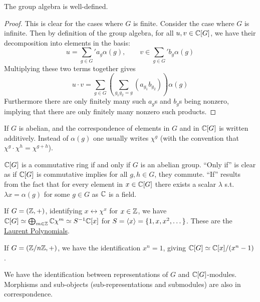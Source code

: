 \documentclass{article}
\begin{document}
\begin{proposition}
    The group algebra is well-defined.
\end{proposition}

\begin{proof}
    This is clear for the cases where $G$ is finite. Consider the case where $G$ is infinite. Then by definition of the group algebra, for all $u, v \in \mathbb{C}[G]$, we have their decomposition into elements in the basis:
    \[
        u = \sum_{g \in G}' a_g \alpha(g), \qquad v \in \sum_{g \in G}' b_g \alpha(g)
    \]
    Multiplying these two terms together gives
    \[
        u \cdot v = \sum_{g \in G} \left( \sum_{g_1 g_2 = g}  (a_{g_1} b_{g_2}) \right) \alpha(g)
    \]
    Furthermore there are only finitely many such $a_g$s and $b_g$s being nonzero, implying that there are only finitely many nonzero such products. 
\end{proof}

\begin{notation}
    If $G$ is abelian, and the correspondence of elements in $G$ and in $\mathbb{C}[G]$ is written additively. Instead of $\alpha(g)$ one usually writes $\chi^g$ (with the convention that $\chi^g \cdot \chi^h = \chi^{g + h}$).
\end{notation}

\begin{remark}
    $\mathbb{C}[G]$ is a commutative ring if and only if $G$ is an abelian group. ``Only if'' is clear as if $\mathbb{C}[G]$ is commutative implies for all $g, h \in G$, they commute. ``If'' results from the fact that for every element in $x \in \mathbb{C}[G]$ there exists a scalar $\lambda$ s.t. $\lambda x = \alpha(g)$ for some $g \in G$ as $\mathbb{C}$ is a field.
\end{remark}

\begin{example}
    If $G = (\mathbb{Z}, +)$, identifying $x \leftrightarrow \chi^x$ for $x \in \mathbb{Z}$, we have $\mathbb{C}[G] \simeq \bigoplus_{m\in \mathbb{Z}} \mathbb{C}\chi^m \simeq S^{-1}\mathbb{C}[x]$ for $S = \left\langle x \right\rangle = \{1, x, x^2, \dots\}$. These are the \underline{Laurent Polynomials}. 
    
    If $G = (\mathbb{Z}/n\mathbb{Z}, +)$, we have the identification $x^n = 1$, giving $\mathbb{C}[G] \simeq \mathbb{C}[x]/(x^n - 1)$.
\end{example}

\begin{proposition}\label{prop: repr of G identifiable with C[G]-modules}
    We have the identification between representations of $G$ and $\mathbb{C}[G]$-modules. Morphisms and sub-objects (sub-representations and submodules) are also in correspondence.
\end{proposition}
\end{document}
